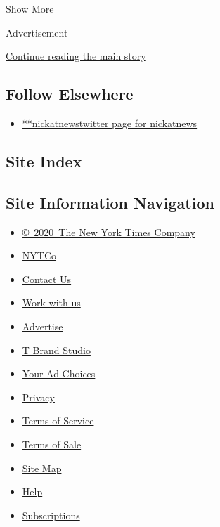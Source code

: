 Show More

Advertisement

\protect\hyperlink{after-mid2}{Continue reading the main story}

\hypertarget{follow-elsewhere}{%
\subsection{Follow Elsewhere}\label{follow-elsewhere}}

\begin{itemize}
\tightlist
\item
  \href{https://twitter.com/nickatnews}{**nickatnewstwitter page for
  nickatnews}
\end{itemize}

\hypertarget{site-index}{%
\subsection{Site Index}\label{site-index}}

\hypertarget{site-information-navigation}{%
\subsection{Site Information
Navigation}\label{site-information-navigation}}

\begin{itemize}
\tightlist
\item
  \href{https://help.nytimes.com/hc/en-us/articles/115014792127-Copyright-notice}{©~2020~The
  New York Times Company}
\end{itemize}

\begin{itemize}
\tightlist
\item
  \href{https://www.nytco.com/}{NYTCo}
\item
  \href{https://help.nytimes.com/hc/en-us/articles/115015385887-Contact-Us}{Contact
  Us}
\item
  \href{https://www.nytco.com/careers/}{Work with us}
\item
  \href{https://nytmediakit.com/}{Advertise}
\item
  \href{http://www.tbrandstudio.com/}{T Brand Studio}
\item
  \href{https://www.nytimes.com/privacy/cookie-policy\#how-do-i-manage-trackers}{Your
  Ad Choices}
\item
  \href{https://www.nytimes.com/privacy}{Privacy}
\item
  \href{https://help.nytimes.com/hc/en-us/articles/115014893428-Terms-of-service}{Terms
  of Service}
\item
  \href{https://help.nytimes.com/hc/en-us/articles/115014893968-Terms-of-sale}{Terms
  of Sale}
\item
  \href{https://spiderbites.nytimes.com}{Site Map}
\item
  \href{https://help.nytimes.com/hc/en-us}{Help}
\item
  \href{https://www.nytimes.com/subscription?campaignId=37WXW}{Subscriptions}
\end{itemize}
